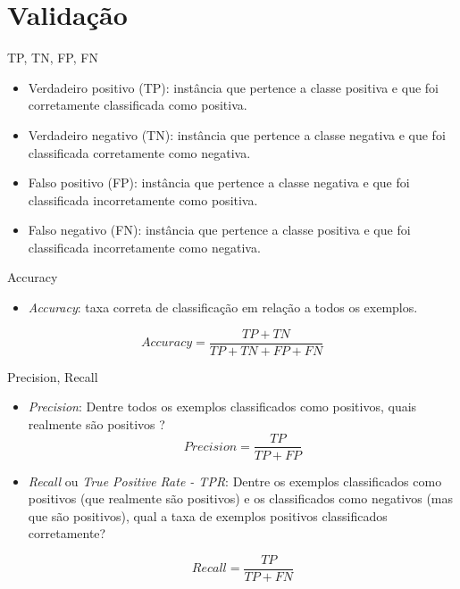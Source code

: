 \documentclass[brazil]{beamer}
\begin{document}
\section{Validação}
\begin{frame}{TP, TN, FP, FN \cite{Olson:2008}}
   \begin{itemize}
      \item <1 ->Verdadeiro positivo (TP): instância que pertence a classe positiva e que foi corretamente classificada como positiva.
      \item <2 ->Verdadeiro negativo (TN): instância que pertence a classe negativa e que foi classificada corretamente como negativa.
      \item <3 ->Falso positivo (FP): instância que pertence a classe negativa e que foi classificada  incorretamente como positiva.
      \item <4 ->Falso negativo (FN): instância que pertence a classe positiva e que foi classificada incorretamente como negativa.
\justifying
   \end{itemize}
\end{frame}

\begin{frame}{Accuracy \cite{Metz:1978}}
   \begin{itemize}
\justifying
     \item \textit{Accuracy}: taxa correta de classificação em relação a todos os exemplos. 
   \end{itemize}
\vspace{0.3in}
\begin{equation} 
  Accuracy = \frac{TP+TN}{TP+TN+FP+FN} 
  \label{eq:accuracy}
\end{equation}
\end{frame}

\begin{frame}{Precision, Recall \cite{Davis:2006}}
   \begin{itemize}

      \item <1 ->\textit{Precision}: Dentre todos os exemplos classificados como positivos, quais realmente são positivos ? 
\justifying
\begin{equation} 
  Precision = \frac{TP}{TP+FP}
  \label{eq:precision}
\end{equation}

      \item <2 ->\textit{Recall} ou \textit{True Positive Rate - TPR}: Dentre os exemplos classificados como positivos (que realmente são positivos) e os classificados como negativos (mas que são positivos), qual a taxa de exemplos positivos classificados corretamente?

\begin{equation} 
  Recall = \frac{TP}{TP+FN} 
  \label{eq:recall}
\end{equation}

   \end{itemize}
\end{frame}
\end{document}
